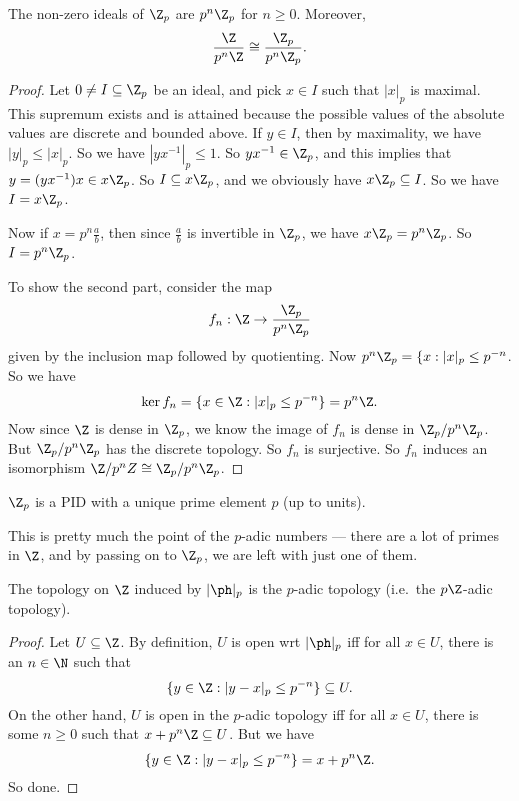 \documentclass[a4paper]{article}
\begin{document}
\begin{prop}
  The non-zero ideals of $\Z_p$ are $p^n \Z_p$ for $n \geq 0$. Moreover,
  \[
    \frac{\Z}{p^n \Z} \cong \frac{\Z_p}{p^n \Z_p}.
  \]
\end{prop}

\begin{proof}
  Let $0 \not= I \subseteq \Z_p$ be an ideal, and pick $x \in I$ such that $|x|_p$ is maximal. This supremum exists and is attained because the possible values of the absolute values are discrete and bounded above. If $y \in I$, then by maximality, we have $|y|_p \leq |x|_p$. So we have $|yx^{-1}|_p \leq 1$. So $yx^{-1} \in \Z_p$, and this implies that $y = (yx^{-1})x \in x\Z_p$. So $I \subseteq x\Z_p$, and we obviously have $x\Z_p \subseteq I$. So we have $I = x\Z_p$.

  Now if $x = p^n \frac{a}{b}$, then since $\frac{a}{b}$ is invertible in $\Z_p$, we have $x\Z_p = p^n \Z_p$. So $I = p^n \Z_p$.

  To show the second part, consider the map
  \[
    f_n: \Z \to \frac{\Z_p}{p^n \Z_p}
  \]
  given by the inclusion map followed by quotienting. Now $p^n \Z_p = \{x : |x|_p \leq p^{-n}$. So we have
  \[
    \ker f_n = \{x \in \Z: |x|_p \leq p^{-n}\} = p^n \Z.
  \]
  Now since $\Z$ is dense in $\Z_p$, we know the image of $f_n$ is dense in $\Z_p/p^n \Z_p$. But $\Z_p/p^n \Z_p$ has the discrete topology. So $f_n$ is surjective. So $f_n$ induces an isomorphism $\Z/p^n Z \cong \Z_p/p^n \Z_p$.
\end{proof}

\begin{cor}
  $\Z_p$ is a PID with a unique prime element $p$ (up to units).
\end{cor}
This is pretty much the point of the $p$-adic numbers --- there are a lot of primes in $\Z$, and by passing on to $\Z_p$, we are left with just one of them.

\begin{prop}
  The topology on $\Z$ induced by $|\ph|_p$ is the $p$-adic topology (i.e.\ the $p\Z$-adic topology).
\end{prop}

\begin{proof}
  Let $U \subseteq \Z$. By definition, $U$ is open wrt $|\ph|_p$ iff for all $x \in U$, there is an $n\in \N$ such that
  \[
    \{y \in \Z: |y - x|_p \leq p^{-n}\} \subseteq U.
  \]
  On the other hand, $U$ is open in the $p$-adic topology iff for all $x \in U$, there is some $n \geq 0$ such that $x + p^n \Z \subseteq U$. But we have
  \[
    \{y \in \Z: |y - x|_p \leq p^{-n}\} = x + p^n \Z.
  \]
  So done.
\end{proof}
\end{document}
